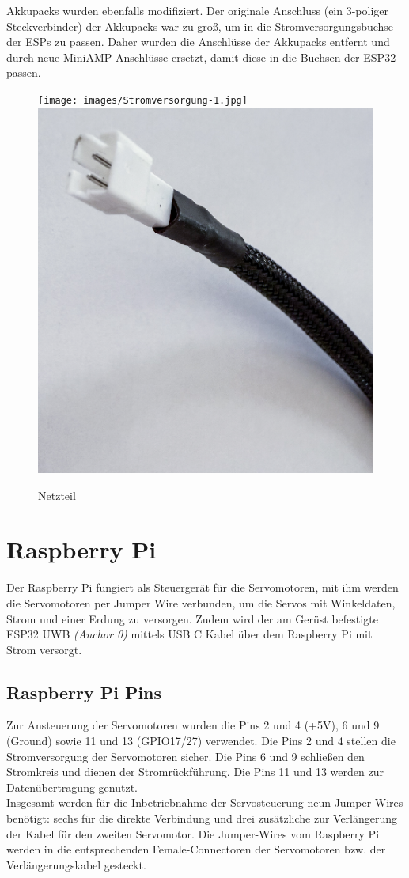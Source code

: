 Akkupacks wurden ebenfalls modifiziert. Der originale Anschluss (ein 3-poliger Steckverbinder) der Akkupacks war zu groß, um in die Stromversorgungsbuchse der ESPs zu passen. Daher wurden die Anschlüsse der Akkupacks entfernt und durch neue MiniAMP-Anschlüsse ersetzt, damit diese in die Buchsen der ESP32 passen.

\begin{figure}[H]
	\centering
	\texttt{[image: images/Stromversorgung-1.jpg]}
	\includegraphics[width=0.4\linewidth]{images/Stromversorgung-2.jpg}
	\caption[Netzteil]{Netzteil}
	\label{fig:Netzteil}
\end{figure}

\section{Raspberry Pi}
Der Raspberry Pi fungiert als Steuergerät für die Servomotoren, mit ihm werden die Servomotoren per Jumper Wire verbunden, um die Servos mit Winkeldaten, Strom und einer Erdung zu versorgen. Zudem wird der am Gerüst befestigte ESP32 UWB \textit{(Anchor 0)} mittels USB C Kabel über dem Raspberry Pi mit Strom versorgt. 

\newpage
\subsection{Raspberry Pi Pins}
Zur Ansteuerung der Servomotoren wurden die Pins 2 und 4 (+5V), 6 und 9 (Ground) sowie 11 und 13 (GPIO17/27) verwendet. Die Pins 2 und 4 stellen die Stromversorgung der Servomotoren sicher. Die Pins 6 und 9 schließen den Stromkreis und dienen der Stromrückführung. Die Pins 11 und 13 werden zur Datenübertragung genutzt.\\
Insgesamt werden für die Inbetriebnahme der Servosteuerung neun Jumper-Wires benötigt: sechs für die direkte Verbindung und drei zusätzliche zur Verlängerung der Kabel für den zweiten Servomotor. Die Jumper-Wires vom Raspberry Pi werden in die entsprechenden Female-Connectoren der Servomotoren bzw. der Verlängerungskabel gesteckt.

